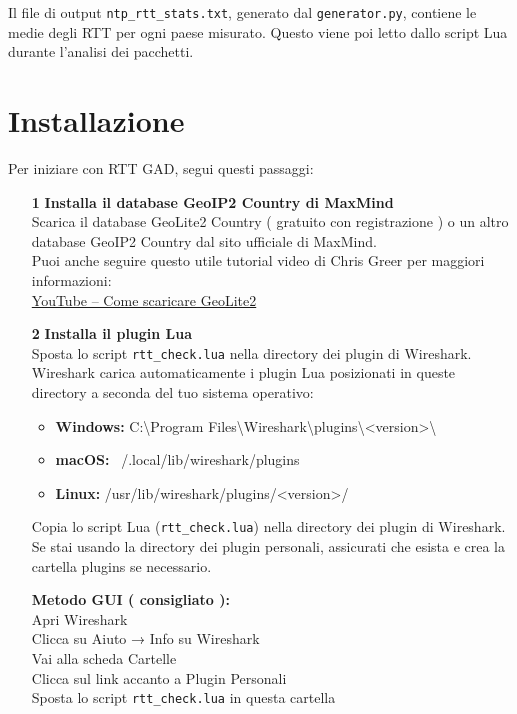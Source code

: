Il file di output \texttt{ntp\_rtt\_stats.txt}, generato dal \texttt{generator.py}, contiene le medie degli RTT per ogni paese misurato. Questo viene poi letto dallo script Lua durante l'analisi dei pacchetti.\\

\section{Installazione}

Per iniziare con RTT GAD, segui questi passaggi:

\begin{enumerate}
  \item[\textbf{1}] \textbf{Installa il database GeoIP2 Country di MaxMind} \\
  Scarica il database GeoLite2 Country ( gratuito con registrazione ) o un altro database GeoIP2 Country dal sito ufficiale di MaxMind.\\

  Puoi anche seguire questo utile tutorial video di Chris Greer per maggiori informazioni: \\
  \href{https://www.youtube.com/watch?v=some-video-id}{YouTube – Come scaricare GeoLite2}
  
  \item[\textbf{2}] \textbf{Installa il plugin Lua} \\
  Sposta lo script \texttt{rtt\_check.lua} nella directory dei plugin di Wireshark. Wireshark carica automaticamente i plugin Lua posizionati in queste directory a seconda del tuo sistema operativo:
  
  \begin{itemize}
    \item \textbf{Windows:} C:\textbackslash Program Files\textbackslash Wireshark\textbackslash plugins\textbackslash <version>\textbackslash
    \item \textbf{macOS:} ~/.local/lib/wireshark/plugins
    \item \textbf{Linux:} /usr/lib/wireshark/plugins/<version>/
  \end{itemize}
  
  Copia lo script Lua (\texttt{rtt\_check.lua}) nella directory dei plugin di Wireshark. Se stai usando la directory dei plugin personali, assicurati che esista e crea la cartella plugins se necessario.
  
  \textbf{Metodo GUI ( consigliato ):} \\
  Apri Wireshark \\
  Clicca su Aiuto → Info su Wireshark \\
  Vai alla scheda Cartelle \\
  Clicca sul link accanto a Plugin Personali \\
  Sposta lo script \texttt{rtt\_check.lua} in questa cartella
  

\end{enumerate}
